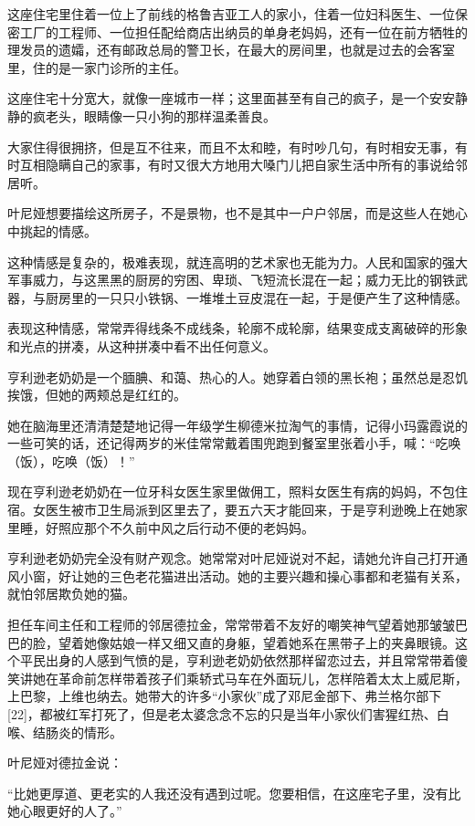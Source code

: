 这座住宅里住着一位上了前线的格鲁吉亚工人的家小，住着一位妇科医生、一位保密工厂的工程师、一位担任配给商店出纳员的单身老妈妈，还有一位在前方牺牲的理发员的遗孀，还有邮政总局的警卫长，在最大的房间里，也就是过去的会客室里，住的是一家门诊所的主任。

这座住宅十分宽大，就像一座城市一样；这里面甚至有自己的疯子，是一个安安静静的疯老头，眼睛像一只小狗的那样温柔善良。

大家住得很拥挤，但是互不往来，而且不太和睦，有时吵几句，有时相安无事，有时互相隐瞒自己的家事，有时又很大方地用大嗓门儿把自家生活中所有的事说给邻居听。

叶尼娅想要描绘这所房子，不是景物，也不是其中一户户邻居，而是这些人在她心中挑起的情感。

这种情感是复杂的，极难表现，就连高明的艺术家也无能为力。人民和国家的强大军事威力，与这黑黑的厨房的穷困、卑琐、飞短流长混在一起；威力无比的钢铁武器，与厨房里的一只只小铁锅、一堆堆土豆皮混在一起，于是便产生了这种情感。

表现这种情感，常常弄得线条不成线条，轮廓不成轮廓，结果变成支离破碎的形象和光点的拼凑，从这种拼凑中看不出任何意义。

亨利逊老奶奶是一个腼腆、和蔼、热心的人。她穿着白领的黑长袍；虽然总是忍饥挨饿，但她的两颊总是红红的。

她在脑海里还清清楚楚地记得一年级学生柳德米拉淘气的事情，记得小玛露霞说的一些可笑的话，还记得两岁的米佳常常戴着围兜跑到餐室里张着小手，喊：“吃唤（饭），吃唤（饭）！”

现在亨利逊老奶奶在一位牙科女医生家里做佣工，照料女医生有病的妈妈，不包住宿。女医生被市卫生局派到区里去了，要五六天才能回来，于是亨利逊晚上在她家里睡，好照应那个不久前中风之后行动不便的老妈妈。

亨利逊老奶奶完全没有财产观念。她常常对叶尼娅说对不起，请她允许自己打开通风小窗，好让她的三色老花猫进出活动。她的主要兴趣和操心事都和老猫有关系，就怕邻居欺负她的猫。

担任车间主任和工程师的邻居德拉金，常常带着不友好的嘲笑神气望着她那皱皱巴巴的脸，望着她像姑娘一样又细又直的身躯，望着她系在黑带子上的夹鼻眼镜。这个平民出身的人感到气愤的是，亨利逊老奶奶依然那样留恋过去，并且常常带着傻笑讲她在革命前怎样带着孩子们乘轿式马车在外面玩儿，怎样陪着太太上威尼斯，上巴黎，上维也纳去。她带大的许多“小家伙”成了邓尼金部下、弗兰格尔部下[22]，都被红军打死了，但是老太婆念念不忘的只是当年小家伙们害猩红热、白喉、结肠炎的情形。

叶尼娅对德拉金说：

“比她更厚道、更老实的人我还没有遇到过呢。您要相信，在这座宅子里，没有比她心眼更好的人了。”

